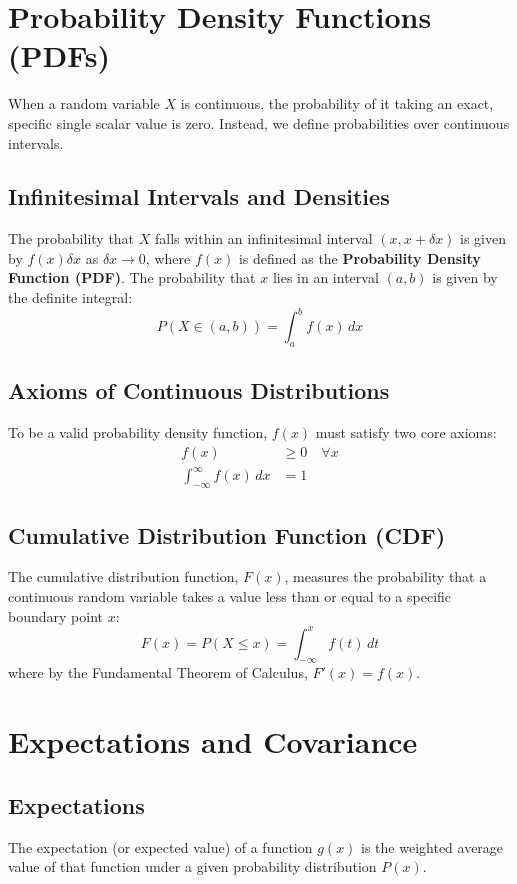 \documentclass[11pt,a4paper]{article}
\begin{document}
\section{Probability Density Functions (PDFs)}
When a random variable $X$ is continuous, the probability of it taking an exact, specific single scalar value is zero. Instead, we define probabilities over continuous intervals.

\subsection{Infinitesimal Intervals and Densities}
The probability that $X$ falls within an infinitesimal interval $(x, x + \delta x)$ is given by $f(x)\delta x$ as \mbox{$\delta x \to 0$}, where $f(x)$ is defined as the \textbf{Probability Density Function (PDF)}. The probability that $x$ lies in an interval $(a, b)$ is given by the definite integral:
\begin{equation}
P(X \in (a, b)) = \int_{a}^{b} f(x) \, dx
\end{equation}

\subsection{Axioms of Continuous Distributions}
To be a valid probability density function, $f(x)$ must satisfy two core axioms:
\begin{align}
f(x) &\ge 0 \quad \forall x \\
\int_{-\infty}^{\infty} f(x) \, dx &= 1
\end{align}

\subsection{Cumulative Distribution Function (CDF)}
The cumulative distribution function, $F(x)$, measures the probability that a continuous random variable takes a value less than or equal to a specific boundary point $x$:
\begin{equation}
F(x) = P(X \le x) = \int_{-\infty}^{x} f(t) \, dt
\end{equation}
where by the Fundamental Theorem of Calculus, $F'(x) = f(x)$.

\section{Expectations and Covariance}
\subsection{Expectations}
The expectation (or expected value) of a function $g(x)$ is the weighted average value of that function under a given probability distribution $P(x)$. 
\end{document}

